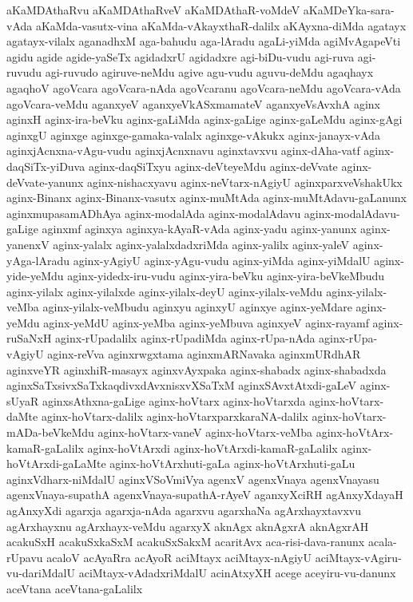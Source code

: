 {aKaMDAthaRvu
aKaMDAthaRveV
aKaMDAthaR-voMdeV
aKaMDeYka-sara-vAda
aKaMda-vasutx-vina
aKaMda-vAkayxthaR-dalilx
aKAyxna-diMda
agatayx
agatayx-vilalx
aganadhxM
aga-bahudu
aga-lAradu
agaLi-yiMda
agiMvAgapeVti
agidu
agide
agide-yaSeTx
agidadxrU
agidadxre
agi-biDu-vudu
agi-ruva
agi-ruvudu
agi-ruvudo
agiruve-neMdu
agive
agu-vudu
aguvu-deMdu
agaqhayx
agaqhoV
agoVcara
agoVcara-nAda
agoVcaranu
agoVcara-neMdu
agoVcara-vAda
agoVcara-veMdu
aganxyeV
aganxyeVkASxmamateV
aganxyeVsAvxhA
aginx
aginxH
aginx-ira-beVku
aginx-gaLiMda
aginx-gaLige
aginx-gaLeMdu
aginx-gAgi
aginxgU
aginxge
aginxge-gamaka-valalx
aginxge-vAkukx
aginx-janayx-vAda
aginxjAcnxna-vAgu-vudu
aginxjAcnxnavu
aginxtavxvu
aginx-dAha-vatf
aginx-daqSiTx-yiDuva
aginx-daqSiTxyu
aginx-deVteyeMdu
aginx-deVvate
aginx-deVvate-yanunx
aginx-nishacxyavu
aginx-neVtarx-nAgiyU
aginxparxveVshakUkx
aginx-Binanx
aginx-Binanx-vasutx
aginx-muMtAda
aginx-muMtAdavu-gaLanunx
aginxmupasamADhAya
aginx-modalAda
aginx-modalAdavu
aginx-modalAdavu-gaLige
aginxmf
aginxya
aginxya-kAyaR-vAda
aginx-yadu
aginx-yanunx
aginx-yanenxV
aginx-yalalx
aginx-yalalxdadxriMda
aginx-yalilx
aginx-yaleV
aginx-yAga-lAradu
aginx-yAgiyU
aginx-yAgu-vudu
aginx-yiMda
aginx-yiMdalU
aginx-yide-yeMdu
aginx-yidedx-iru-vudu
aginx-yira-beVku
aginx-yira-beVkeMbudu
aginx-yilalx
aginx-yilalxde
aginx-yilalx-deyU
aginx-yilalx-veMdu
aginx-yilalx-veMba
aginx-yilalx-veMbudu
aginxyu
aginxyU
aginxye
aginx-yeMdare
aginx-yeMdu
aginx-yeMdU
aginx-yeMba
aginx-yeMbuva
aginxyeV
aginx-rayamf
aginx-ruSaNxH
aginx-rUpadalilx
aginx-rUpadiMda
aginx-rUpa-nAda
aginx-rUpa-vAgiyU
aginx-reVva
aginxrwgxtama
aginxmARNavaka
aginxmURdhAR
aginxveYR
aginxhiR-masayx
aginxvAyxpaka
aginx-shabadx
aginx-shabadxda
aginxSaTxsivxSaTxkaqdivxdAvxnisxvXSaTxM
aginxSAvxtAtxdi-gaLeV
aginx-sUyaR
aginxsAthxna-gaLige
aginx-hoVtarx
aginx-hoVtarxda
aginx-hoVtarx-daMte
aginx-hoVtarx-dalilx
aginx-hoVtarxparxkaraNA-dalilx
aginx-hoVtarx-mADa-beVkeMdu
aginx-hoVtarx-vaneV
aginx-hoVtarx-veMba
aginx-hoVtArx-kamaR-gaLalilx
aginx-hoVtArxdi
aginx-hoVtArxdi-kamaR-gaLalilx
aginx-hoVtArxdi-gaLaMte
aginx-hoVtArxhuti-gaLa
aginx-hoVtArxhuti-gaLu
aginxVdharx-niMdalU
aginxVSoVmiVya
agenxV
agenxVnaya
agenxVnayasu
agenxVnaya-supathA
agenxVnaya-supathA-rAyeV
aganxyXciRH
agAnxyXdayaH
agAnxyXdi
agarxja
agarxja-nAda
agarxvu
agarxhaNa
agArxhayxtavxvu
agArxhayxnu
agArxhayx-veMdu
agarxyX
aknAgx
aknAgxrA
aknAgxrAH
acakuSxH
acakuSxkaSxM
acakuSxSakxM
acaritAvx
aca-risi-dava-ranunx
acala-rUpavu
acaloV
acAyaRra
acAyoR
aciMtayx
aciMtayx-nAgiyU
aciMtayx-vAgiru-vu-dariMdalU
aciMtayx-vAdadxriMdalU
acinAtxyXH
acege
aceyiru-vu-danunx
aceVtana
aceVtana-gaLalilx
}
